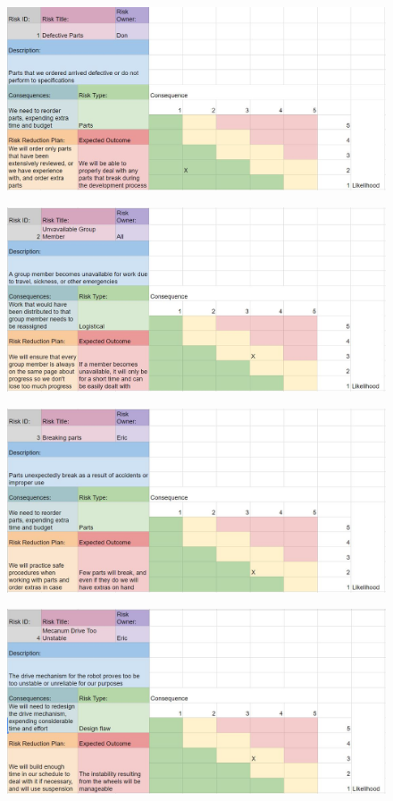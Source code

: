 \begin{figure}[h!]
\centering
\includegraphics[width=0.98\columnwidth]{risks/risk1.JPG}
\label{fig:risk1}
\end{figure}
\begin{figure}[h!]
\centering
\includegraphics[width=0.98\columnwidth]{risks/risk2.JPG}
\label{fig:risk2}
\end{figure}
\begin{figure}[h!]
\centering
\includegraphics[width=0.98\columnwidth]{risks/risk3.JPG}
\label{fig:risk3}
\end{figure}
\begin{figure}[h!]
\centering
\includegraphics[width=0.98\columnwidth]{risks/risk4.JPG}
\label{fig:risk4}
\end{figure}
